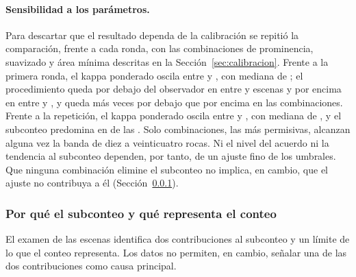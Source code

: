 \paragraph{Sensibilidad a los parámetros.} Para descartar que el resultado dependa de la
calibración se repitió la comparación, frente a cada ronda, con las \cSenN{} combinaciones de
prominencia, suavizado y área mínima descritas en la Sección~\ref{sec:calibracion}. Frente a la
primera ronda, el kappa ponderado oscila entre \cSenMin{} y \cSenMax, con mediana de \cSenMed; el
procedimiento queda por debajo del observador en entre \cSenAbajoMin{} y \cSenAbajoMax{} escenas
y por encima en entre \cSenArribaMin{} y \cSenArribaMax, y queda más veces por debajo que por
encima en las \cSenMasAbajo{} combinaciones. Frente a la repetición, el kappa ponderado oscila
entre \cSenSegMin{} y \cSenSegMax, con mediana de \cSenSegMed, y el subconteo predomina en
\cSenSegMasAbajo{} de las \cSenSegN. Solo \cSenDiez{} combinaciones, las más permisivas, alcanzan
alguna vez la banda de diez a veinticuatro rocas. Ni el nivel del acuerdo ni la tendencia al
subconteo dependen, por tanto, de un ajuste fino de los umbrales. Que ninguna combinación
elimine el subconteo no implica, en cambio, que el ajuste no contribuya a él
(Sección~\ref{sec:anotacion-parcial}).

\subsubsection{Por qué el subconteo y qué representa el conteo}
\label{sec:anotacion-parcial}

El examen de las escenas identifica dos contribuciones al subconteo y un límite de lo que el
conteo representa. Los datos no permiten, en cambio, señalar una de las dos contribuciones como
causa principal.

